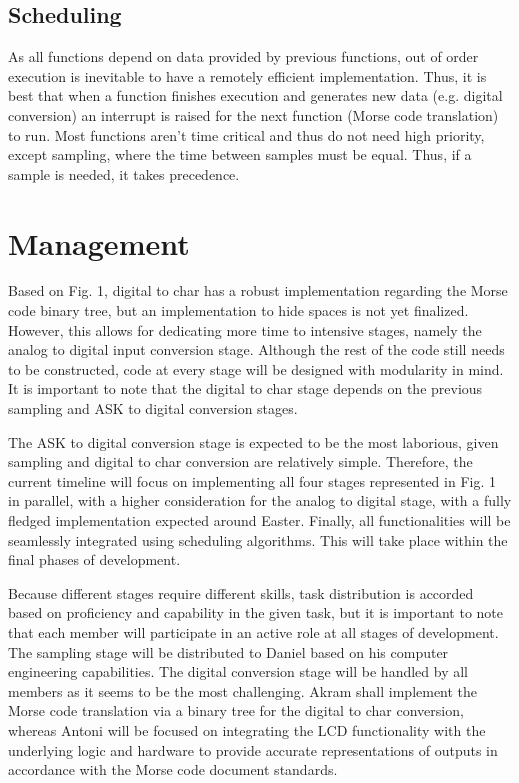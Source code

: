 \documentclass{cce2014-design}
\begin{document}
\subsection{Scheduling}

As all functions depend on data provided by previous functions, out of order execution is inevitable to have a remotely efficient implementation. Thus, it is best that when a function finishes execution and generates new data (e.g. digital conversion) an interrupt is raised for the next function (Morse code translation) to run. Most functions aren’t time critical and thus do not need high priority, except sampling, where the time between samples must be equal. Thus, if a sample is needed, it takes precedence.

\section{Management}
Based on Fig. 1, digital to char has a robust implementation regarding the Morse code binary tree, but an implementation to hide spaces is not yet finalized. However, this allows for dedicating more time to intensive stages, namely the analog to digital input conversion stage. Although the rest of the code still needs to be constructed, code at every stage will be designed with modularity in mind. It is important to note that the digital to char stage depends on the previous sampling and ASK to digital conversion stages. 

The ASK to digital conversion stage is expected to be the most laborious, given sampling and digital to char conversion are relatively simple. Therefore, the current timeline will focus on implementing all four stages represented in Fig. 1 in parallel, with a higher consideration for the analog to digital stage, with a fully fledged implementation expected around Easter. Finally, all functionalities will be seamlessly integrated using scheduling algorithms. This will take place within the final phases of development. 

Because different stages require different skills, task distribution is accorded based on proficiency and capability in the given task, but it is important to note that each member will participate in an active role at all stages of development. The sampling stage will be distributed to Daniel based on his computer engineering capabilities. The digital conversion stage will be handled by all members as it seems to be the most challenging. Akram shall implement the Morse code translation via a binary tree for the digital to char conversion, whereas Antoni will be focused on integrating the LCD functionality with the underlying logic and hardware to provide accurate representations of outputs in accordance with the Morse code document standards.
\end{document}
